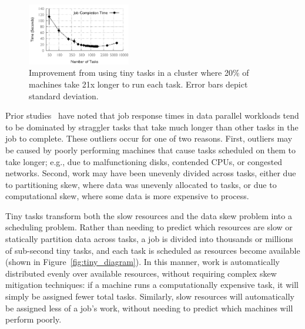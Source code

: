 \begin{figure}[t]
    \includegraphics[width=0.4\textwidth]{figures/spark-skew-results}
    \vspace{-3ex}
    \caption{Improvement from using tiny tasks in a cluster where 20\% of machines
take 21x longer to run each task. Error bars depict standard deviation.}
    \label{fig:sparkskew}
\end{figure}
Prior studies~\cite{ananthanarayanan2010reining,zaharia2008improving} have
noted that job response times in data parallel workloads tend to be
dominated by straggler tasks that take much longer than other tasks in the
job to complete.
These outliers occur for one of two reasons.
First, outliers may be caused by poorly performing machines that cause tasks scheduled
on them to take longer; e.g.,
due to malfunctioning disks, contended CPUs, or congested networks.
Second, work may have been unevenly
divided across tasks, either due to
partitioning skew, where data was unevenly allocated to tasks, or due to
computational skew, where some data is more expensive to process.

Tiny tasks transform both the slow resources and the data skew problem
into a scheduling problem.  Rather than needing to predict which resources
are slow or statically partition data across tasks, a job is divided into
thousands or millions of sub-second tiny tasks, and each task is scheduled
as resources become available (shown in Figure~\ref{fig:tiny_diagram}).  In this manner, work is automatically
distributed evenly over available resources, without requiring complex skew
mitigation techniques: if a machine runs a computationally expensive task, it
will simply be assigned fewer total tasks.  Similarly, slow resources will
automatically be assigned less of a job's work, without needing to predict which
machines will perform poorly.

